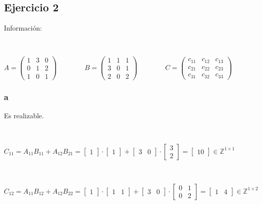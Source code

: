 \documentclass{article}
\begin{document}
    \subsection*{Ejercicio 2}

Información:

\

\begin{center}
$A = \begin{pmatrix}
    1 & 3 & 0 \\
    0 & 1 & 2 \\
    1 & 0 & 1
\end{pmatrix} 
~~~~~~~~~~~~~~~~~~
B = \begin{pmatrix}
    1 & 1 & 1 \\
    3 & 0 & 1 \\
    2 & 0 & 2
\end{pmatrix}
~~~~~~~~~~~~~~~~~~
C = \begin{pmatrix}
    c_{11} & c_{12} & c_{13} \\
    c_{21} & c_{22} & c_{23} \\
    c_{31} & c_{32} & c_{33}
\end{pmatrix}$
\end{center}

\subsubsection*{a}
Es realizable.

\

$C_{11} = A_{11}B_{11} + A_{12}B_{21} =  
\begin{bmatrix}
    1    
\end{bmatrix}
\cdot
\begin{bmatrix}
    1
\end{bmatrix}
+
\begin{bmatrix}
    3 & 0
\end{bmatrix}
\cdot
\begin{bmatrix}
    3 \\
    2
\end{bmatrix} 
=
\begin{bmatrix}
    10
\end{bmatrix} \in \mathbb{Z}^{1\times 1}$

\

$C_{12} = A_{11}B_{12} + A_{12}B_{22} =  
\begin{bmatrix}
    1    
\end{bmatrix}
\cdot
\begin{bmatrix}
    1 & 1
\end{bmatrix}
+
\begin{bmatrix}
    3 & 0
\end{bmatrix}
\cdot
\begin{bmatrix}
    0 & 1 \\
    0 & 2
\end{bmatrix}
=
\begin{bmatrix}
    1 & 4
\end{bmatrix} \in \mathbb{Z}^{1\times 2}$
\end{document}
